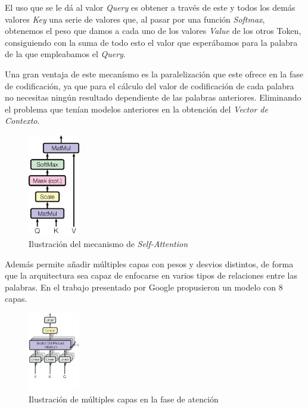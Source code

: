 \begin{itemize}
El uso que se le dá al valor \textit{Query} es obtener a través de este y todos los demás valores \textit{Key} una serie de valores que, al pasar por una función \textit{Softmax}, obtenemos el peso que damos a cada uno de los valores \textit{Value} de los otros Token, consiguiendo con la suma de todo esto el valor que esperábamos para la palabra de la que empleabamos el \textit{Query}.

Una gran ventaja de este mecanísmo es la paralelización que este ofrece en la fase de codificación, ya que para el cálculo del valor de codificación de cada palabra no necesitas ningún resultado dependiente de las palabras anteriores. Eliminando el problema que tenían modelos anteriores en la obtención del \textit{Vector de Contexto}.

\begin{figure}
	\centering
	\includegraphics[width = 0.2\textwidth]{Imagenes/Vectorial/ScaledDotProduct.pdf}
	\caption{Ilustración del mecanismo de \textit{Self-Attention}}%
	\label{fig:Scaled Dot-Product Attention}
\end{figure}

Además permite añadir múltiples capas con pesos y desvios distintos, de forma que la arquitectura sea capaz de enfocarse en varios tipos de relaciones entre las palabras. En el trabajo presentado por Google propusieron un modelo con 8 capas.

\begin{figure}
	\centering
	\includegraphics[width = 0.2\textwidth]{Imagenes/Vectorial/MultiHeadAttention.pdf}
	\caption{Ilustración de múltiples capas en la fase de atención}%
	\label{fig:Multi-Head Attention}
\end{figure}
\end{itemize}

